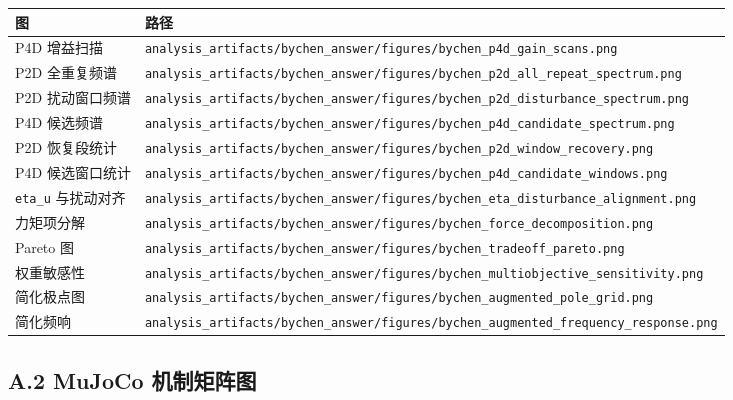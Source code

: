 \begin{longtable}[]{@{}
  >{\raggedright\arraybackslash}p{}
  >{\raggedright\arraybackslash}p{}@{}}
\toprule\noalign{}
\begin{minipage}[b]{\linewidth}\raggedright
图
\end{minipage} & \begin{minipage}[b]{\linewidth}\raggedright
路径
\end{minipage} \\
\midrule\noalign{}
\endhead
\bottomrule\noalign{}
\endlastfoot
P4D 增益扫描 & \texttt{analysis\_artifacts/bychen\_answer/figures/bychen\_p4d\_gain\_scans.png} \\
P2D 全重复频谱 & \texttt{analysis\_artifacts/bychen\_answer/figures/bychen\_p2d\_all\_repeat\_spectrum.png} \\
P2D 扰动窗口频谱 & \texttt{analysis\_artifacts/bychen\_answer/figures/bychen\_p2d\_disturbance\_spectrum.png} \\
P4D 候选频谱 & \texttt{analysis\_artifacts/bychen\_answer/figures/bychen\_p4d\_candidate\_spectrum.png} \\
P2D 恢复段统计 & \texttt{analysis\_artifacts/bychen\_answer/figures/bychen\_p2d\_window\_recovery.png} \\
P4D 候选窗口统计 & \texttt{analysis\_artifacts/bychen\_answer/figures/bychen\_p4d\_candidate\_windows.png} \\
\texttt{eta\_u} 与扰动对齐 & \texttt{analysis\_artifacts/bychen\_answer/figures/bychen\_eta\_disturbance\_alignment.png} \\
力矩项分解 & \texttt{analysis\_artifacts/bychen\_answer/figures/bychen\_force\_decomposition.png} \\
Pareto 图 & \texttt{analysis\_artifacts/bychen\_answer/figures/bychen\_tradeoff\_pareto.png} \\
权重敏感性 & \texttt{analysis\_artifacts/bychen\_answer/figures/bychen\_multiobjective\_sensitivity.png} \\
简化极点图 & \texttt{analysis\_artifacts/bychen\_answer/figures/bychen\_augmented\_pole\_grid.png} \\
简化频响 & \texttt{analysis\_artifacts/bychen\_answer/figures/bychen\_augmented\_frequency\_response.png} \\
\end{longtable}

\subsection{A.2 MuJoCo 机制矩阵图}\label{a.2-mujoco-ux673aux5236ux77e9ux9635ux56fe}

